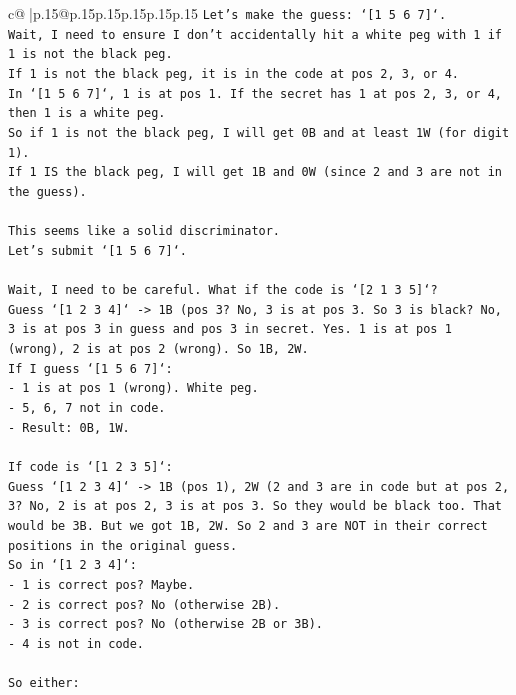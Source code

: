 \documentclass{article}
\begin{document}
{\begin{supertabular}{c@{$\;$}|p{.15\linewidth}@{}p{.15\linewidth}p{.15\linewidth}p{.15\linewidth}p{.15\linewidth}p{.15\linewidth}}
{{{\texttt{Let's make the guess: `{[}1 5 6 7{]}`.} \\
\texttt{Wait, I need to ensure I don't accidentally hit a white peg with 1 if 1 is not the black peg.} \\
\texttt{If 1 is not the black peg, it is in the code at pos 2, 3, or 4.} \\
\texttt{In `{[}1 5 6 7{]}`, 1 is at pos 1. If the secret has 1 at pos 2, 3, or 4, then 1 is a white peg.} \\
\texttt{So if 1 is not the black peg, I will get 0B and at least 1W (for digit 1).} \\
\texttt{If 1 IS the black peg, I will get 1B and 0W (since 2 and 3 are not in the guess).} \\
\\ 
\texttt{This seems like a solid discriminator.} \\
\texttt{Let's submit `{[}1 5 6 7{]}`.} \\
\\ 
\texttt{Wait, I need to be careful. What if the code is `{[}2 1 3 5{]}`?} \\
\texttt{Guess `{[}1 2 3 4{]}` {-}> 1B (pos 3? No, 3 is at pos 3. So 3 is black? No, 3 is at pos 3 in guess and pos 3 in secret. Yes. 1 is at pos 1 (wrong), 2 is at pos 2 (wrong). So 1B, 2W.} \\
\texttt{If I guess `{[}1 5 6 7{]}`:} \\
\texttt{{-} 1 is at pos 1 (wrong). White peg.} \\
\texttt{{-} 5, 6, 7 not in code.} \\
\texttt{{-} Result: 0B, 1W.} \\
\\ 
\texttt{If code is `{[}1 2 3 5{]}`:} \\
\texttt{Guess `{[}1 2 3 4{]}` {-}> 1B (pos 1), 2W (2 and 3 are in code but at pos 2, 3? No, 2 is at pos 2, 3 is at pos 3. So they would be black too. That would be 3B. But we got 1B, 2W. So 2 and 3 are NOT in their correct positions in the original guess.} \\
\texttt{So in `{[}1 2 3 4{]}`:} \\
\texttt{{-} 1 is correct pos? Maybe.} \\
\texttt{{-} 2 is correct pos? No (otherwise 2B).} \\
\texttt{{-} 3 is correct pos? No (otherwise 2B or 3B).} \\
\texttt{{-} 4 is not in code.} \\
\\ 
\texttt{So either:} \\
}}}
\end{supertabular}}
\end{document}
